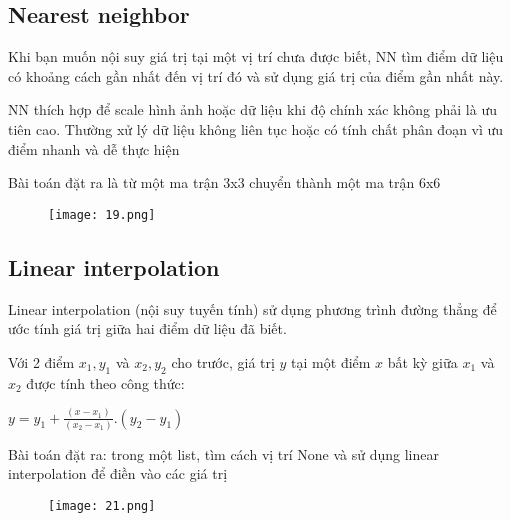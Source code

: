 \documentclass[a4paper,12pt,openany]{article}
\begin{document}
\subsection{Nearest neighbor}
Khi bạn muốn nội suy giá trị tại một vị trí chưa được biết, NN tìm điểm dữ liệu có khoảng cách gần nhất đến vị trí đó và sử dụng giá trị của điểm gần nhất này. 
\par
\vspace{10pt}
NN thích hợp để scale hình ảnh hoặc dữ liệu khi độ chính xác không phải là ưu tiên cao.
Thường xử lý dữ liệu không liên tục hoặc có tính chất phân đoạn vì ưu điểm nhanh và dễ thực hiện
\par
\vspace{10pt}
Bài toán đặt ra là từ một ma trận 3x3 chuyển thành một ma trận 6x6 
\begin{figure}[H]
    \centering
    \texttt{[image: 19.png]}
    \label{fig:enter-label}
\end{figure}

\clearpage
\subsection{Linear interpolation}
Linear interpolation (nội suy tuyến tính) sử dụng phương trình đường thẳng để ước tính giá trị giữa hai điểm dữ liệu đã biết.
\par
\vspace{10pt}
Với 2 điểm $x_1,y_1$ và $x_2,y_2$ cho trước, giá trị $y$ tại một điểm $x$ bất kỳ giữa $x_1$ và $x_2$ được tính theo công thức:
\begin{center}
\large
    $y = y_1 + \frac{(x-x_1)}{(x_2-x_1)}.(y_2-y_1)$
\end{center}
Bài toán đặt ra: trong một list, tìm cách vị trí None và sử dụng linear interpolation để điền vào các giá trị 
\begin{figure}[H]
    \centering
    \texttt{[image: 21.png]}
    \label{fig:enter-label}
\end{figure}
\end{document}
